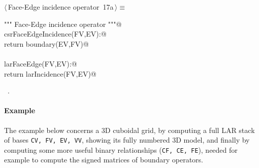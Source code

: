 \documentclass[11pt,oneside]{article}	%
\begin{document}
\begin{flushleft} \small \label{scrap29}
\protect{}$\langle\,$Face-Edge incidence operator\nobreak\ {\footnotesize 17a}$\,\rangle\equiv$
\vspace{-1ex}
\begin{list}{}{} \item
\mbox{}\verb@""" Face-Edge incidence operator """@\\
\mbox{}\verb@def csrFaceEdgeIncidence(FV,EV):@\\
\mbox{}\verb@   return boundary(EV,FV)@\\
\mbox{}\verb@@\\
\mbox{}\verb@def larFaceEdge(FV,EV):@\\
\mbox{}\verb@   return larIncidence(FV,EV)@\\
\mbox{}\verb@@{\NWsep}
\end{list}
\vspace{-1ex}
\footnotesize\addtolength{\baselineskip}{-1ex}
\begin{list}{}{\setlength{\itemsep}{-\parsep}\setlength{\itemindent}{-\leftmargin}}
\item \NWtxtMacroRefIn\ .
\end{list}
\end{flushleft}


\paragraph{Example}
The example below concerns a 3D cuboidal grid, by computing a full LAR stack of bases
\texttt{CV, FV, EV, VV}, showing its fully numbered 3D model, and finally by computing
some more useful binary relationships (\texttt{CF, CE, FE}), needed for example to compute the signed matrices of boundary operators.
\end{document}
